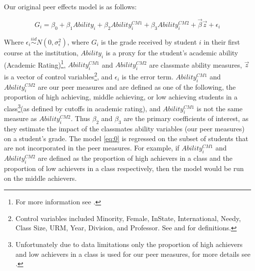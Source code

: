 Our original peer effects model is as follows:
\setlength{\belowdisplayskip}{6pt} \setlength{\belowdisplayshortskip}{1pt}
\setlength{\abovedisplayskip}{-4pt} \setlength{\abovedisplayshortskip}{1pt}

\begin{equation}\label{eq:0}
G_{i} = \beta_{0} + \beta_{1} Ability_{i} + \beta_{2} Ability_{i}^{CM1} + \beta_{3} Ability_{i}^{CM2} + \overrightarrow{\beta} \overrightarrow{z} + \epsilon_{i}
\end{equation}

Where $\epsilon_{i} \stackrel{iid}{\sim} N(0,\sigma_{\epsilon}^2)$, where $G_{i}$ is the grade received by student $i$ in their first course at the institution, $Ability_{i}$ is a proxy for the student's academic ability (Academic Rating)\footnote{For more information see .}, $Ability_{i}^{CM1}$ and $Ability_{i}^{CM2}$ are classmate ability measures, $\overrightarrow{z}$ is a vector of control variables\footnote{Control variables included Minority, Female, InState, International, Needy, Class Size, URM, Year, Division, and Professor. See  and  for definitions.}, and $\epsilon_{i}$ is the error term. 
$Ability_{i}^{CM1}$ and $Ability_{i}^{CM2}$ are our peer measures and are defined as one of the following, the proportion of high achieving, middle achieving, or low achieving students in a class\footnote{Unfortunately due to data limitations only the proportion of high achievers and low achievers in a class is used for our peer measures, for more details see .}(as defined by cutoffs in academic rating), and $Ability_{i}^{CM1}$ is not the same measure as  $Ability_{i}^{CM2}$. 
Thus $\beta_{2}$ and $\beta_{3}$ are the primary coefficients of interest, as they estimate the impact of the classmates ability variables (our peer measures) on a student's grade. 
The model \eqref{eq:0} is regressed on the subset of students that are not incorporated in the peer measures. 
For example, if $Ability_{i}^{CM1}$ and $Ability_{i}^{CM2}$ are defined as the proportion of high achievers in a class and the proportion of low achievers in a class respectively, then the model would be run on the middle achievers. 

